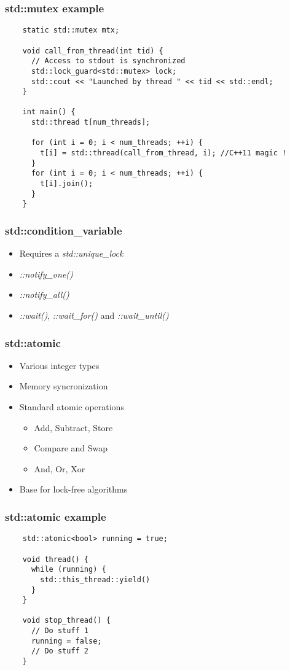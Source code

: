 \begin{frame}[fragile]
  \frametitle{std::mutex example}

  \begin{verbatim}
    static std::mutex mtx;

    void call_from_thread(int tid) {
      // Access to stdout is synchronized
      std::lock_guard<std::mutex> lock;
      std::cout << "Launched by thread " << tid << std::endl;
    }

    int main() {
      std::thread t[num_threads];

      for (int i = 0; i < num_threads; ++i) {
        t[i] = std::thread(call_from_thread, i); //C++11 magic !
      }
      for (int i = 0; i < num_threads; ++i) {
        t[i].join();
      }
    }
  \end{verbatim}
\end{frame}


\begin{frame}
  \frametitle{std::condition\_variable}

  \begin{itemize}
  \item Requires a \emph{std::unique\_lock}
  \item \emph{::notify\_one()}
  \item \emph{::notify\_all()}
  \item \emph{::wait()}, \emph{::wait\_for()} and \emph{::wait\_until()}
  \end{itemize}
\end{frame}


\begin{frame}
  \frametitle{std::atomic}

  \begin{itemize}
  \item Various integer types
  \item Memory syncronization
  \item Standard atomic operations
    \begin{itemize}
    \item Add, Subtract, Store
    \item Compare and Swap
    \item And, Or, Xor
    \end{itemize}
  \item Base for lock-free algorithms
  \end{itemize}
\end{frame}


\begin{frame}[fragile]
  \frametitle{std::atomic example}

  \begin{verbatim}
    std::atomic<bool> running = true;

    void thread() {
      while (running) {
        std::this_thread::yield()
      }
    }

    void stop_thread() {
      // Do stuff 1
      running = false;
      // Do stuff 2
    }
  \end{verbatim}
\end{frame}


